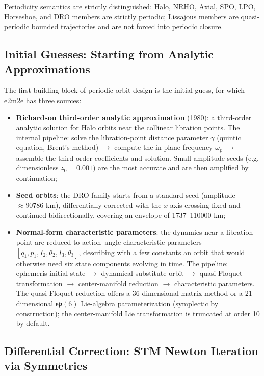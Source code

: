 Periodicity semantics are strictly distinguished: Halo, NRHO, Axial, SPO,
LPO, Horseshoe, and DRO members are strictly periodic; Lissajous members are
quasi-periodic bounded trajectories and are not forced into periodic closure.

\subsection{Initial Guesses: Starting from Analytic Approximations}

The first building block of periodic orbit design is the initial guess, for
which e2m2e has three sources:

\begin{itemize}
  \item \textbf{Richardson third-order analytic approximation} (1980): a
        third-order analytic solution for Halo orbits near the collinear
        libration points. The internal pipeline: solve the libration-point
        distance parameter $\gamma$ (quintic equation, Brent's method) $\to$
        compute the in-plane frequency $\omega_p$ $\to$ assemble the
        third-order coefficients and solution. Small-amplitude seeds (e.g.
        dimensionless $z_0 = 0.001$) are the most accurate and are then
        amplified by continuation;
  \item \textbf{Seed orbits}: the DRO family starts from a standard seed
        (amplitude $\approx 90786$ km), differentially corrected with the
        $x$-axis crossing fixed and continued bidirectionally, covering an
        envelope of 1737--110000 km;
  \item \textbf{Normal-form characteristic parameters}: the dynamics near a
        libration point are reduced to action--angle characteristic
        parameters $[q_1, p_1, I_2, \theta_2, I_3, \theta_3]$, describing
        with a few constants an orbit that would otherwise need six state
        components evolving in time. The pipeline: ephemeris initial state
        $\to$ dynamical substitute orbit $\to$ quasi-Floquet transformation
        $\to$ center-manifold reduction $\to$ characteristic parameters. The
        quasi-Floquet reduction offers a 36-dimensional matrix method or a
        21-dimensional $\mathfrak{sp}(6)$ Lie-algebra parameterization
        (symplectic by construction); the center-manifold Lie transformation
        is truncated at order 10 by default.
\end{itemize}

\subsection{Differential Correction: STM Newton Iteration via Symmetries}

